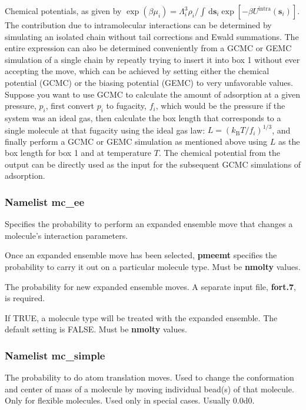 \documentclass[12pt,letterpaper]{article}
\begin{document}
 Chemical potentials, as given by
$\exp(\beta\mu_i)=\Lambda_i^3\rho_i/\int\,\mathrm{d}\mathbf{s}_i\exp[-\beta U^{\text{intra}}(\mathbf{s}_i)]$.
The contribution due to intramolecular interactions can be
determined by simulating an isolated chain without tail
corrections and Ewald summations. The entire expression can
also be determined conveniently from a GCMC or GEMC
simulation of a single chain by repeatly trying to insert it
into box 1 without ever accepting the move, which can be
achieved by setting either the chemical potential (GCMC) or
the biasing potential (GEMC) to very unfavorable values.
Suppose you want to use GCMC to calculate the amount of
adsorption at a given pressure, $p_i$, first convert $p_i$
to fugacity, $f_i$, which would be the pressure if the
system was an ideal gas, then calculate the box length that
corresponds to a single molecule at that fugacity using the
ideal gas law: $L=(k_{\text{B}}T/f_i)^{1/3}$, and finally
perform a GCMC or GEMC simulation as mentioned above using
$L$ as the box length for box 1 and at temperature $T$. The
chemical potential from the output can be directly used as
the input for the subsequent GCMC simulations of adsorption.

\subsubsection{Namelist \textbf{mc\_ee}}
 Specifies the probability to perform
an expanded ensemble move that changes a molecule's
interaction parameters.

 Once an expanded ensemble move has
been selected, {\bf pmeemt} specifies the probability to
carry it out on a particular molecule type. Must be {\bf
  nmolty} values.

 The probability for new expanded
ensemble moves. A separate input file, {\bf fort.7}, is
required.

 If TRUE, a molecule type will be
treated with the expanded ensemble. The default setting is
FALSE. Must be {\bf nmolty} values.

\subsubsection{Namelist \textbf{mc\_simple}}
 The probability to do atom
translation moves. Used to change the conformation and
center of mass of a molecule by moving individual bead(s) of
that molecule. Only for flexible molecules. Used only in
special cases. Usually 0.0d0.
\end{document}
